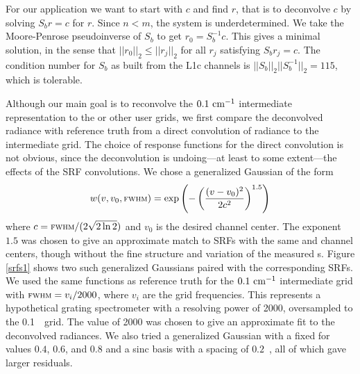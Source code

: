 \documentclass[10pt,twocolumn]{article}
\begin{document}
For our application we want to start with $c$ and find $r$, that is
to deconvolve $c$ by solving $S_b r = c$ for $r$.  Since $n < m$, the
system is underdetermined.  We take the Moore-Penrose pseudoinverse
\cite{wiki:pinv} of $S_b$ to get $r_0 = S_b^{-1} c$.  This gives a
minimal solution, in the sense that $||r_0||_2 \le ||r_j||_2$ for
all $r_j$ satisfying $S_b r_j = c$.  The condition number for $S_b$
as built from the L1c channels is $||S_b||_2||S_b^{-1}||_2 = 115$,
which is tolerable.

Although our main goal is to reconvolve the $0.1~\mbox{cm$^{-1}$}$ intermediate
representation to the {\cris} or other user grids, we first compare
the deconvolved radiance with reference truth from a direct
convolution of {\kcarta} radiance to the intermediate grid.  The
choice of response functions for the direct convolution is not
obvious, since the deconvolution is undoing---at least to some
extent---the effects of the {\airs} SRF convolutions.  We chose a
generalized Gaussian \cite{wiki:gauss} of the form
\[w(v, v_0, \mbox{\small\textsc{fwhm}}) = 
\exp\left(-\left(\frac{(v - v_0)^2}{2c^2}\right)^{1.5}\right) \]
where $c=\mbox{\small\textsc{fwhm}} / (2\sqrt{2\ln 2})$ and $v_0$ is the desired channel
center.  The exponent $1.5$ was chosen to give an approximate match
to {\airs} SRFs with the same {\FWHM} and channel centers, though
without the fine structure and variation of the measured \srf s.
Figure \ref{srfs1} shows two such generalized Gaussians paired with
the corresponding {\airs} SRFs.  We used the same functions as
reference truth for the $0.1~\mbox{cm$^{-1}$}$ intermediate grid with ${\mbox{\small\textsc{fwhm}}} =
v_i / 2000$, where $v_i$ are the grid frequencies.  This represents
a hypothetical grating spectrometer with a resolving power of 2000,
oversampled to the 0.1~\wn\ grid.  The value of 2000 was chosen to
give an approximate fit to the deconvolved radiances.  We also tried
a generalized Gaussian with a fixed {\FWHM} for values $0.4$, $0.6$,
and $0.8$ and a sinc basis with a spacing of $0.2$~\wn, all of which
gave larger residuals.
\end{document}
